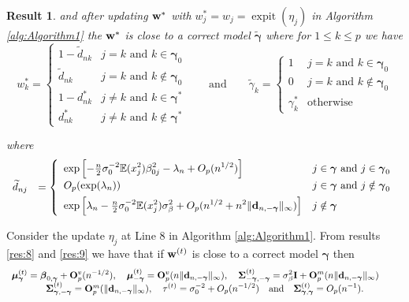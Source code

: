 \documentclass[11pt]{article}
\newtheorem{Result}{Result}
\newtheorem{Main Result}{Main Result}
\def\vectorfontone{\bf}
\def\vectorfonttwo{\boldsymbol}
\def\vd{{\vectorfontone d}}                      %
\def\vw{{\vectorfontone w}}                      %
\def\vy{{\vectorfontone y}}                      %
\def\vbeta{{\vectorfonttwo \beta}}               %
\def\vgamma{{\vectorfonttwo \gamma}}             %
\def\vmu{{\vectorfonttwo \mu}}                   %
\def\matrixfontone{\bf}
\def\matrixfonttwo{\boldsymbol}
\def\mI{{\matrixfontone I}}                      %
\def\mO{{\matrixfontone O}}                      %
\def\mX{{\matrixfontone X}}                      %
\def\mSigma{{\matrixfonttwo \Sigma}}             %
\def\bE{{\mathbb E}}                             %
\def\ds{\displaystyle}
\def\diag{\text{diag}}
\DeclareMathOperator{\expit}{expit}
\begin{document}
{\begin{Result}
	\noindent and
	after updating $\vw^*$ with $w_j^*=w_j=\expit(\eta_j)$ in
	Algorithm \ref{alg:Algorithm1}
	the $\vw^*$ is close to a correct model $\widetilde{\vgamma}$ where for $1\le k\le p$ we have
	$$
	w_k^{*} = \left\{ \begin{array}{ll}
	1 - \widetilde{d}_{nk}   & j=k \mbox{ and } k\in\vgamma_0 \\
	\widetilde{d}_{nk}     & j=k \mbox{ and } k\notin\vgamma_0\\
	1 - d_{nk}^*   &  j\neq k \mbox{ and } k\in\vgamma^* \\
	d_{nk}^*     & j\neq k \mbox{ and } k\notin\vgamma^*
	\end{array} \right.
	\qquad
	\mbox{and}
	\qquad
	\widetilde{\gamma}_k = \left\{ \begin{array}{ll}
	1    & \mbox{$j=k$ and $k\in\vgamma_0$} \\
	0    & \mbox{$j=k$ and $k\notin\vgamma_0$} \\
	\gamma_k^*   & \mbox{otherwise}
	\end{array} \right.
	$$
	
	\noindent where
	$$
	\begin{array}{rl}
	\ds \widetilde{d}_{nj}
	& \ds = \left\{ \begin{array}{ll}
	\ds \exp\left[ - \tfrac{n}{2} \sigma^{-2}_0  \bE(x_j^2)\beta_{0j}^2 - \lambda_n
	+ O_p(n^{1/2}) \right]
	& \mbox{$j\in \vgamma$ and $j\in\vgamma_0$}\\[1ex]
	\ds O_p(\exp(\lambda_n))
	&  \mbox{$j\in \vgamma$ and $j\notin\vgamma_0$} \\ [1ex]
	\ds \exp\left[ \lambda_n -
	\tfrac{n}{2} \sigma^{-2}_0 \bE(x_j^2)\sigma_\beta^2
	+ O_p(n^{1/2} + n^2\|\vd_{n,-\vgamma}\|_\infty) \right]
	&  \mbox{$j\notin \vgamma$}
	\end{array} \right.
	\end{array}
	$$
\end{Result}

\medskip
{}
Consider the update $\eta_j$ at Line 8 in Algorithm \ref{alg:Algorithm1}.
%
From results \ref{res:8} and \ref{res:9} we have that
if $\vw^{(t)}$ is close to a correct model $\vgamma$ then
$$
\begin{array}{c}
\ds \vmu_{\vgamma}^{(t)}  = \vbeta_{0,\vgamma} + \mO_p^v(n^{-1/2}),
\quad
\vmu_{-\vgamma}^{(t)} = \mO_p^v(n\|\vd_{n,-\vgamma}\|_\infty),
\quad
\mSigma_{-\vgamma,-\vgamma}^{(t)}  = \sigma_\beta^2\mI + \mO_p^m(n\|\vd_{n,-\vgamma}\|_\infty)\qquad
\\
\mSigma_{\vgamma,-\vgamma}^{(t)}  = \mO_p^m(\|\vd_{n,-\vgamma}\|_\infty),
\quad
\ds \tau^{(t)} = \sigma_0^{-2}
+O_p(n^{-1/2}) \quad \mbox{and} \quad \mSigma_{\vgamma,\vgamma}^{(t)}=
	O_p(n^{-1}).
\end{array}
$$

}
\end{document}
